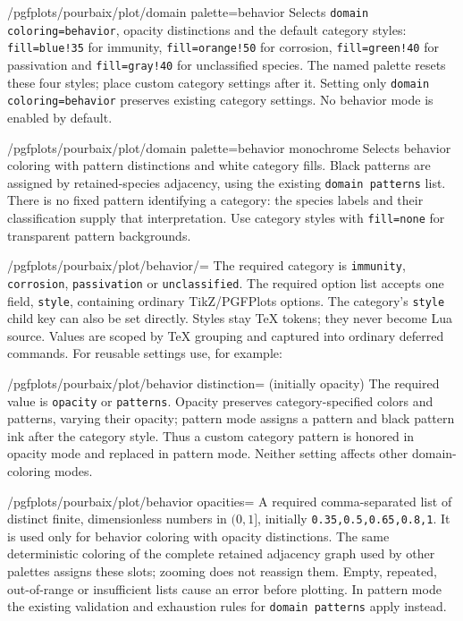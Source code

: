 \documentclass[a4paper,11pt]{ltxdoc}
\begin{document}
\begin{key}{/pgfplots/pourbaix/plot/domain palette=behavior}
Selects \texttt{domain coloring=behavior}, opacity distinctions and the default
category styles: \texttt{fill=blue!35} for immunity, \texttt{fill=orange!50} for
corrosion, \texttt{fill=green!40} for passivation and \texttt{fill=gray!40} for
unclassified species. The named palette resets these four styles; place custom
category settings after it. Setting only \texttt{domain coloring=behavior}
preserves existing category settings. No behavior mode is enabled by default.
\end{key}
\begin{key}{/pgfplots/pourbaix/plot/domain palette=behavior monochrome}
Selects behavior coloring with pattern distinctions and white category fills.
Black patterns are assigned by retained-species adjacency, using the existing
\texttt{domain patterns} list. There is no fixed pattern identifying a category:
the species labels and their classification supply that interpretation.
Use category styles with \texttt{fill=none} for transparent pattern backgrounds.
\end{key}
\begin{key}{/pgfplots/pourbaix/plot/behavior/=}
The required category is \texttt{immunity}, \texttt{corrosion},
\texttt{passivation} or \texttt{unclassified}. The required option list accepts
one field, \texttt{style}, containing ordinary TikZ/PGFPlots options.
The category's \texttt{style} child key can also be set directly.
Styles stay TeX tokens; they never become Lua source. Values are scoped by TeX
grouping and captured into ordinary deferred  commands.
For reusable settings use, for example:
\begin{codeexample}[width=0pt]
\end{codeexample}
\end{key}
\begin{key}{/pgfplots/pourbaix/plot/behavior distinction= (initially opacity)}
The required value is \texttt{opacity} or \texttt{patterns}. Opacity preserves
category-specified colors and patterns, varying their opacity; pattern mode
assigns a pattern and black pattern ink after the category style. Thus a custom
category pattern is honored in opacity mode and replaced in pattern mode.
Neither setting affects other domain-coloring modes.
\end{key}
\begin{key}{/pgfplots/pourbaix/plot/behavior opacities=}
A required comma-separated list of distinct finite, dimensionless numbers in
$(0,1]$, initially \texttt{0.35,0.5,0.65,0.8,1}. It is used only for behavior
coloring with opacity distinctions. The same deterministic coloring of the
complete retained adjacency graph used by other palettes assigns these slots;
zooming does not reassign them. Empty, repeated, out-of-range or insufficient
lists cause an error before plotting. In pattern mode the existing validation
and exhaustion rules for \texttt{domain patterns} apply instead.
\end{key}
\end{document}
